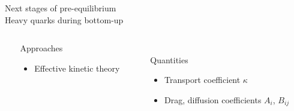 \documentclass[aspectratio=169,11pt,usenames,dvipsnames]{beamer}
\begin{document}
\begin{frame}{}
    \begin{center}
        \vspace{1cm}
        {\large\color{normal}Next stages of pre-equilibrium}\\[0.3cm]
        {\huge\color{destacado}Heavy quarks during bottom-up}\\[0.3cm]
        {\large\color{normal}
        \begin{center}
            \begin{columns}
                \begin{column}{0.066\textwidth}\end{column}
                \begin{column}{0.35\textwidth}
                    \centering
                    {\Large\color{ming} Approaches}\vspace{2pt}
                    \begin{itemize}
                        \item Effective kinetic theory
                    \end{itemize}
                \end{column}
                \begin{column}{0.066\textwidth}\end{column}
                \begin{column}{0.45\textwidth}
                    \centering
                    \\[10pt]
                    {\Large\color{pinky} Quantities}
                    \begin{itemize}
                        \item Transport coefficient $\kappa$
                        \item Drag, diffusion coefficients $A_i$, $B_{ij}$
                    \end{itemize}
                \end{column}
                \begin{column}{0.066\textwidth}\end{column}
            \end{columns}
        \end{center}
        }
    \end{center}
\end{frame}
\end{document}
